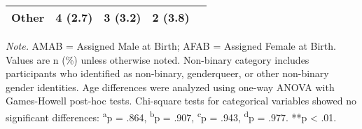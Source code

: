 \documentclass[12pt,a4paper]{article}
\begin{document}
\begin{table}[htbp]
\begin{tabular}{lcccc}
\quad Other & 4 (2.7) & 3 (3.2) & 2 (3.8) & \\
\bottomrule
\end{tabular}
\begin{tablenotes}
\small
\item \textit{Note.} AMAB = Assigned Male at Birth; AFAB = Assigned Female at Birth. Values are n (\%) unless otherwise noted. Non-binary category includes participants who identified as non-binary, genderqueer, or other non-binary gender identities. Age differences were analyzed using one-way ANOVA with Games-Howell post-hoc tests. Chi-square tests for categorical variables showed no significant differences: \textsuperscript{a}p = .864, \textsuperscript{b}p = .907, \textsuperscript{c}p = .943, \textsuperscript{d}p = .977. **p < .01.
\end{tablenotes}
\end{table}
\end{document}
